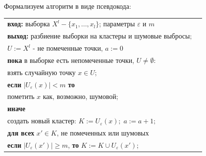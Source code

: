 Формализуем алгоритм в виде псевдокода:\\
\begin{tabularx}{\linewidth}{lX}
    \textbf{вход:} выборка $X^l - \{x_1,...,x_l\}$; параметры $\varepsilon$ и $m$                                                                   \\
    \textbf{выход:} разбиение выборки на кластеры и шумовые выбросы;                                                                                \\\hspace*{7mm}\hspace*{9mm}$U := X^l$ - не помеченные точки, $a := 0$\\
    \textbf{пока} в выборке есть непомеченные точки, $U \neq \emptyset$:                                                                            \\
    \hspace*{7mm} взять случайную точку $x \in U$;                                                                                                  \\
    \hspace*{7mm} \textbf{если} $\lvert U_\varepsilon (x) \rvert < m$ \textbf{то}                                                                   \\
    \hspace*{7mm}\hspace*{7mm} пометить $x$ как, возможно, шумовой;                                                                                 \\
    \hspace*{7mm}\textbf{иначе}                                                                                                                     \\
    \hspace*{7mm}\hspace*{7mm} создать новый кластер: $K:=U_\varepsilon (x); \; a:=a+1;$                                                            \\
    \hspace*{7mm}\hspace*{7mm} \textbf{для всех} $x' \in K$, не помеченных или шумовых                                                              \\
    \hspace*{7mm}\hspace*{7mm}\hspace*{7mm} \textbf{если} $\lvert U_\varepsilon (x') \rvert \geq m$,  \textbf{то} $K := K \cup U_\varepsilon (x')$; \\

\end{tabularx}
